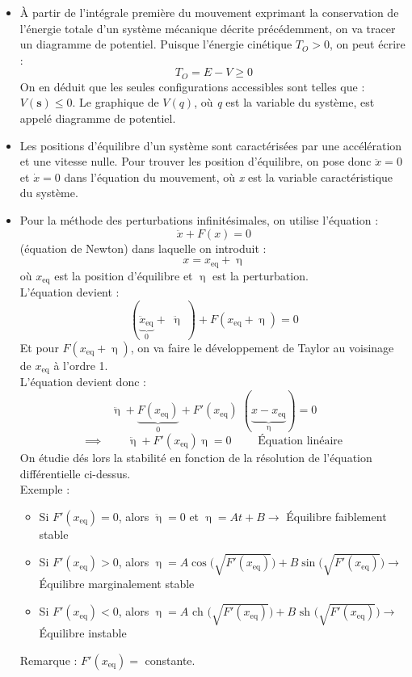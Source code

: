 \documentclass[a4paper]{article}
\begin{document}
\begin{itemize}
\item À partir de l'intégrale première du mouvement exprimant la conservation de l'énergie totale d'un système mécanique décrite précédemment, on va tracer un diagramme de potentiel. Puisque l'énergie cinétique $ T_O > 0 $, on peut écrire : 
\[ T_O = E - V \geq 0 \]
On en déduit que les seules configurations accessibles sont telles que : $ V(\textbf{s}) \leq 0 $. Le graphique de $ V(q) $, où \emph{q} est la variable du système, est appelé diagramme de potentiel.





\item Les positions d'équilibre d'un système sont caractérisées par une accélération et une vitesse nulle. Pour trouver les position d'équilibre, on pose donc $ \ddot{x} = 0 $ et $ \dot{x} = 0 $ dans l'équation du mouvement, où \emph{x} est la variable caractéristique du système.





\item Pour la méthode des perturbations infinitésimales, on utilise l'équation : 
\[ \ddot{x} + F(x) = 0 \]
(équation de Newton) dans laquelle on introduit : 
\[ x = x_{\text{eq}} + \upeta \]
où $ x_{\text{eq}} $ est la position d'équilibre et $ \upeta $ est la perturbation. \\
L'équation devient : 
\[ ( \underbrace{\ddot{x}_{\text{eq}}}_{0} + \; \ddot{\upeta} \; ) + F(x_{\text{eq}} + \upeta) = 0 \]
Et pour $ F(x_{\text{eq}} + \upeta) $, on va faire le développement de Taylor au voisinage de $ x_{\text{eq}} $ à l'ordre 1. \\
L'équation devient donc : 
\[ \ddot{\upeta} + \underbrace{F(x_{\text{eq}})}_{0} + F'(x_{\text{eq}}) \; (\underbrace{x - x_{\text{eq}}}_{\upeta}) = 0 \]
\[ \implies \qquad \ddot{\upeta} + F'(x_{\text{eq}}) \upeta = 0 \qquad \text{ Équation linéaire } \]
On étudie dés lors la stabilité en fonction de la résolution de l'équation différentielle ci-dessus. \\
Exemple : 
\begin{itemize}
\item Si $ F'(x_{\text{eq}}) = 0 $, alors $ \ddot{\upeta} = 0 $ et $ \upeta = A t + B \longrightarrow $ Équilibre faiblement stable
\item Si $ F'(x_{\text{eq}}) > 0 $, alors $ \upeta = A \cos \Big( \sqrt{F'(x_{\text{eq}})} \Big) + B \sin \Big( \sqrt{F'(x_{\text{eq}})} \Big) \longrightarrow $ Équilibre marginalement stable
\item Si $ F'(x_{\text{eq}}) < 0 $, alors $ \upeta = A \text{ ch } \Big( \sqrt{F'(x_{\text{eq}})} \Big) + B \text{ sh } \Big( \sqrt{F'(x_{\text{eq}})} \Big) \longrightarrow $ Équilibre instable
\end{itemize}
Remarque : $ F'(x_{\text{eq}}) = $ constante.






\end{itemize}
\end{document}
